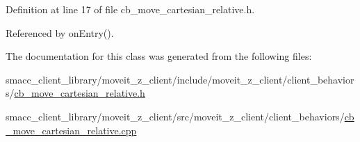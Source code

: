 Definition at line 17 of file cb\+\_\+move\+\_\+cartesian\+\_\+relative.\+h.



Referenced by on\+Entry().



The documentation for this class was generated from the following files\+:\begin{DoxyCompactItemize}
\item 
smacc\+\_\+client\+\_\+library/moveit\+\_\+z\+\_\+client/include/moveit\+\_\+z\+\_\+client/client\+\_\+behaviors/\hyperlink{cb__move__cartesian__relative_8h}{cb\+\_\+move\+\_\+cartesian\+\_\+relative.\+h}\item 
smacc\+\_\+client\+\_\+library/moveit\+\_\+z\+\_\+client/src/moveit\+\_\+z\+\_\+client/client\+\_\+behaviors/\hyperlink{cb__move__cartesian__relative_8cpp}{cb\+\_\+move\+\_\+cartesian\+\_\+relative.\+cpp}\end{DoxyCompactItemize}
